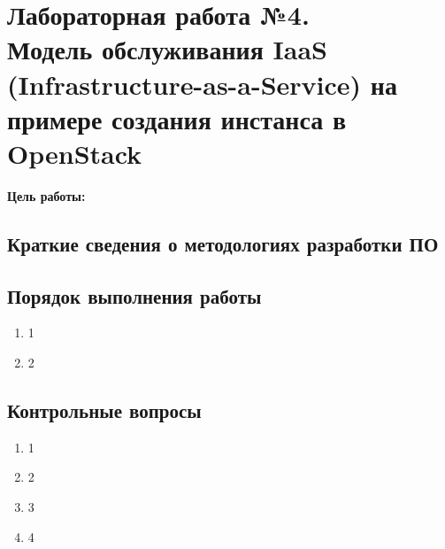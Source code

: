 \section[Лабораторная работа №3]{Лабораторная работа №4. \\
Модель обслуживания IaaS (Infrastructure-as-a-Service) на примере создания инстанса в OpenStack}

\textbf{Цель работы:}

\subsection{Краткие сведения о методологиях разработки ПО}


\subsection{Порядок выполнения работы}

\begin{enumerate}
    \item 1
    \item 2
\end{enumerate}

\subsection{Контрольные вопросы}
\begin{enumerate}
    \item 1
    \item 2
    \item 3
    \item 4
\end{enumerate}

\clearpage
